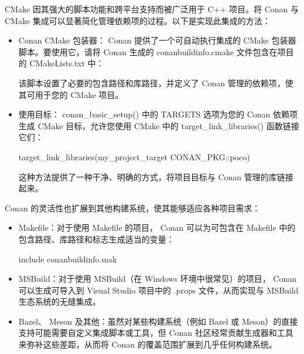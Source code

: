 
CMake 因其强大的脚本功能和跨平台支持而被广泛用于 C++ 项目。将 Conan 与 CMake 集成可以显著简化管理依赖项的过程。以下是实现此集成的方法：

\begin{itemize}
\item
Conan CMake 包装器： Conan 提供了一个可自动执行集成的 CMake 包装器脚本。要使用它，请将 Conan 生成的 conanbuildinfo.cmake 文件包含在项目的 CMakeLists.txt 中：


该脚本设置了必要的包含路径和库路径，并定义了 Conan 管理的依赖项，使其可用于您的 CMake 项目。

\item
使用目标： conan\_basic\_setup() 中的 TARGETS 选项为您的 Conan 依赖项生成 CMake 目标，允许您使用 CMake 中的 target\_link\_libraries() 函数链接它们：

\begin{cmake}
target_link_libraries(my_project_target CONAN_PKG::poco)
\end{cmake}

这种方法提供了一种干净、明确的方式，将项目目标与 Conan 管理的库链接起来。
\end{itemize}


Conan 的灵活性也扩展到其他构建系统，使其能够适应各种项目需求：

\begin{itemize}
\item
Makefile：对于使用 Makefile 的项目， Conan 可以为可包含在 Makefile 中的包含路径、库路径和标志生成适当的变量：

\begin{shell}
include conanbuildinfo.mak
\end{shell}

\item
MSBuild：对于使用 MSBuild（在 Windows 环境中很常见）的项目， Conan 可以生成可导入到 Visual Studio 项目中的 .props 文件，从而实现与 MSBuild 生态系统的无缝集成。

\item
Bazel、 Meson 及其他：虽然对某些构建系统（例如 Bazel 或 Meson）的直接支持可能需要自定义集成脚本或工具，但 Conan 社区经常贡献生成器和工具来弥补这些差距，从而将 Conan 的覆盖范围扩展到几乎任何构建系统。
\end{itemize}

